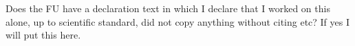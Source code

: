 
\begin{declaration}

Does the FU have a declaration text in which I declare that I worked on this alone, up to scientific standard, did not copy anything without citing etc? If yes I will put this here.


\end{declaration}

